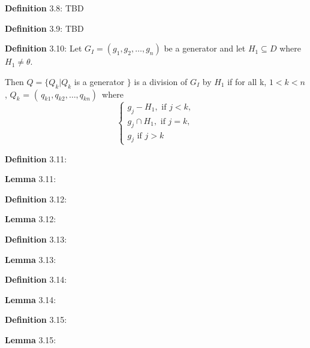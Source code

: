 \documentclass{article}
\begin{document}
\par 
\textbf{Definition} 3.8: TBD
\newline


\par 
\textbf{Definition} 3.9: TBD
\newline


\par 
\textbf{Definition} 3.10: Let $G_I = (g_1, g_2, \ldots, g_n)$ be a generator 
and let $H_1 \subseteq D$ where $H_1 \neq \theta$. 

Then $Q = \{ Q_k |Q_k$ is a generator $\}$ is a division of $G_I$ by $H_1$ if
for all k, $1 < k < n$, $Q_k$ = $( \, q_{k1}, q_{k2}, \ldots, q_{kn} ) \,$ where
\[
	\begin{cases}
		g_j - H_1, \text{ if } j < k,\\
		g_j \cap H_1, \text{ if } j = k,\\
		g_j \text{ if } j > k
	\end{cases}
\]


\par 
\textbf{Definition} 3.11:
\newline

\par 
\textbf{Lemma} 3.11:
\newline

\par 
\textbf{Definition} 3.12:
\newline

\par 
\textbf{Lemma} 3.12:
\newline


\par 
\textbf{Definition} 3.13:
\newline

\par 
\textbf{Lemma} 3.13:
\newline


\par 
\textbf{Definition} 3.14:
\newline

\par 
\textbf{Lemma} 3.14:
\newline



\par 
\textbf{Definition} 3.15:
\newline

\par 
\textbf{Lemma} 3.15:
\newline
\end{document}
